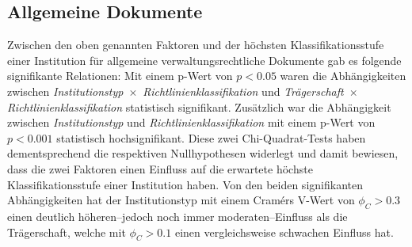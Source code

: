 \subsection{Allgemeine Dokumente}\label{sec:policy-discussion-general}
Zwischen den oben genannten Faktoren und der höchsten Klassifikationsstufe einer Institution für allgemeine verwaltungsrechtliche Dokumente gab es folgende signifikante Relationen:
Mit einem p-Wert von $p<\num{0,05}$ waren die Abhängigkeiten zwischen \textit{Institutionstyp}~$\times$~\textit{Richtlinienklassifikation} und \textit{Trägerschaft}~$\times$\textit{Richtlinienklassifikation} statistisch signifikant.
Zusätzlich war die Abhängigkeit zwischen \textit{Institutionstyp} und \textit{Richtlinienklassifikation} mit einem p-Wert von $p<\num{0,001}$ statistisch hochsignifikant.
Diese zwei Chi-Quadrat-Tests haben dementsprechend die respektiven Nullhypothesen widerlegt und damit bewiesen, dass die zwei Faktoren einen Einfluss auf die erwartete höchste Klassifikationsstufe einer Institution haben.
Von den beiden signifikanten Abhängigkeiten hat der Institutionstyp mit einem Cramérs V-Wert von $\phi_C>\num{0.3}$ einen deutlich höheren--jedoch noch immer moderaten--Einfluss als die Trägerschaft, welche mit $\phi_C>\num{0.1}$ einen vergleichsweise schwachen Einfluss hat.

